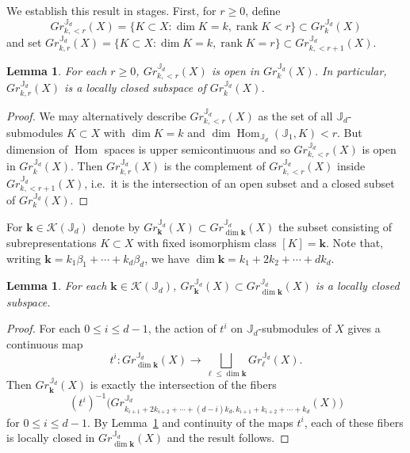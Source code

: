 \documentclass{amsart}
\numberwithin{equation}{section}
\newtheorem{lemma}[theorem]{Lemma}
\theoremstyle{definition}
\def\JJ{\mathbb{J}}
\def\bfk{\mathbf{k}}
\def\cK{\mathcal{K}}
\def\dim{\operatorname{dim}}
\def\rank{\operatorname{rank}}
\def\Hom{\operatorname{Hom}}
\begin{document}
We establish this result in stages.  First, for $r\ge0$, define 
\[Gr_{k,<r}^{\JJ_d}(X)=\{K\subset X:\dim K=k,\rank K<r\}\subset Gr_k^{\JJ_d}(X)\] 
and set $Gr_{k,r}^{\JJ_d}(X)=\{K\subset X:\dim K=k,\rank K=r\}\subset Gr_{k,<r+1}^{\JJ_d}(X)$.
\begin{lemma}\label{le:rank stratification}
  For each $r\ge0$, $Gr_{k,<r}^{\JJ_d}(X)$ is open in $Gr_k^{\JJ_d}(X)$.  In particular, $Gr_{k,r}^{\JJ_d}(X)$ is a locally closed subspace of $Gr_k^{\JJ_d}(X)$.
\end{lemma}
\begin{proof}
  We may alternatively describe $Gr_{k,<r}^{\JJ_d}(X)$ as the set of all $\JJ_d$-submodules $K\subset X$ with $\dim K=k$ and $\dim\Hom_{\JJ_d}(\JJ_1,K)<r$.  But dimension of $\Hom$ spaces is upper semicontinuous and so $Gr_{k,<r}^{\JJ_d}(X)$ is open in $Gr_k^{\JJ_d}(X)$.  Then $Gr_{k,r}^{\JJ_d}(X)$ is the complement of $Gr_{k,<r}^{\JJ_d}(X)$ inside $Gr_{k,<r+1}^{\JJ_d}(X)$, i.e.\ it is the intersection of an open subset and a closed subset of $Gr_{k}^{\JJ_d}(X)$.
\end{proof}
For $\bfk\in\cK(\JJ_d)$ denote by $Gr^{\JJ_d}_\bfk(X)\subset Gr^{\JJ_d}_{\dim\bfk}(X)$ the subset consisting of subrepresentations $K\subset X$ with fixed isomorphism class $[K]=\bfk$.  Note that, writing $\bfk=k_1\beta_1+\cdots+k_d\beta_d$, we have $\dim\bfk=k_1+2k_2+\cdots+dk_d$.
\begin{lemma}\label{le:isotypic stratification}
  For each $\bfk\in\cK(\JJ_d)$, $Gr^{\JJ_d}_\bfk(X)\subset Gr^{\JJ_d}_{\dim\bfk}(X)$ is a locally closed subspace.
\end{lemma}
\begin{proof}
  For each $0\le i\le d-1$, the action of $t^i$ on $\JJ_d$-submodules of $X$ gives a continuous map 
  \[t^i:Gr^{\JJ_d}_{\dim\bfk}(X)\to\bigsqcup_{\ell\le\dim\bfk} Gr_\ell^{\JJ_d}(X).\]
  Then $Gr^{\JJ_d}_\bfk(X)$ is exactly the intersection of the fibers 
  \[(t^i)^{-1}\big(Gr_{k_{i+1}+2k_{i+2}+\cdots+(d-i)k_d,k_{i+1}+k_{i+2}+\cdots+k_d}^{\JJ_d}(X)\big)\]
  for $0\le i\le d-1$.  By Lemma~\ref{le:rank stratification} and continuity of the maps $t^i$, each of these fibers is locally closed in $Gr_{\dim\bfk}^{\JJ_d}(X)$ and the result follows.
\end{proof}
\end{document}
